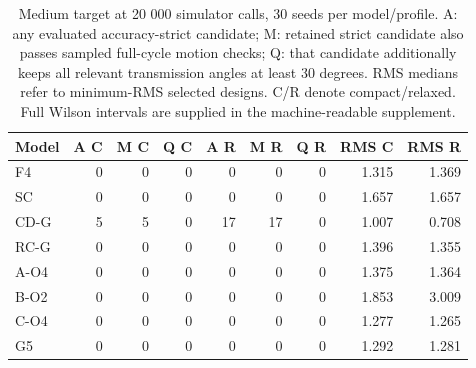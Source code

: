 \begin{table}[H]
\caption{Medium target at 20 000 simulator calls, 30 seeds per model/profile. A: any evaluated accuracy-strict candidate; M: retained strict candidate also passes sampled full-cycle motion checks; Q: that candidate additionally keeps all relevant transmission angles at least 30 degrees. RMS medians refer to minimum-RMS selected designs. C/R denote compact/relaxed. Full Wilson intervals are supplied in the machine-readable supplement.}
\label{tab:v2_medium}
\centering
\small
\begin{tabular}{@{}lrrrrrrrr@{}}
\toprule
Model & A C & M C & Q C & A R & M R & Q R & RMS C & RMS R \\
\midrule
F4 & 0 & 0 & 0 & 0 & 0 & 0 & 1.315 & 1.369 \\
SC & 0 & 0 & 0 & 0 & 0 & 0 & 1.657 & 1.657 \\
CD-G & 5 & 5 & 0 & 17 & 17 & 0 & 1.007 & 0.708 \\
RC-G & 0 & 0 & 0 & 0 & 0 & 0 & 1.396 & 1.355 \\
A-O4 & 0 & 0 & 0 & 0 & 0 & 0 & 1.375 & 1.364 \\
B-O2 & 0 & 0 & 0 & 0 & 0 & 0 & 1.853 & 3.009 \\
C-O4 & 0 & 0 & 0 & 0 & 0 & 0 & 1.277 & 1.265 \\
G5 & 0 & 0 & 0 & 0 & 0 & 0 & 1.292 & 1.281 \\
\bottomrule
\end{tabular}
\end{table}
